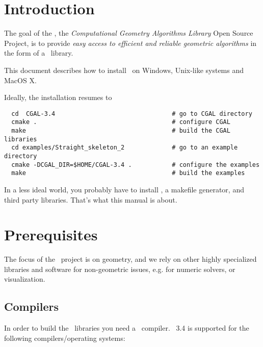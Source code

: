 \newcommand{\TTindex}[1]{\index{#1@{\tt #1}}}
\newcommand{\TTsubindex}[2]{\index{#1@{\tt #1}!{#2}}}
\newcommand{\TTsubindextwo}[2]{\index{#1!#2@{\tt #2} }}

\section{Introduction}


The goal of the \cgal, the \textit{Computational Geometry Algorithms Library}
 Open Source Project, is to provide {\em easy access to efficient and reliable 
geometric algorithms} in the form of a \CC\ library.

This document describes how to install \cgal\ on Windows, Unix-like systems and MacOS X.

Ideally, the installation resumes to

\begin{verbatim}
  cd  CGAL-3.4                                # go to CGAL directory
  cmake .                                     # configure CGAL
  make                                        # build the CGAL libraries
  cd examples/Straight_skeleton_2             # go to an example directory
  cmake -DCGAL_DIR=$HOME/CGAL-3.4 .           # configure the examples
  make                                        # build the examples 
\end{verbatim}

In a less ideal world, you probably have to install \cmake, a makefile
generator, and third party libraries. That's what this manual is about.

\section{Prerequisites\label{sec:prerequisites}}

The focus of the \cgal\ project is on geometry, and we rely on other
highly specialized libraries and software for non-geometric issues,
e.g. for numeric solvers, or visualization.

\subsection{Compilers}

In order to build the \cgal\ libraries you need a \CC\ compiler.  
\cgal~3.4 is supported for the following compilers/operating systems:

